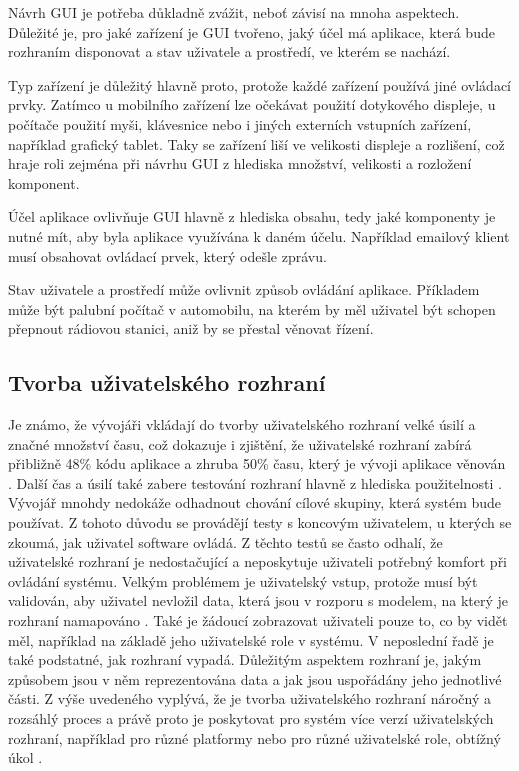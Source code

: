 Návrh GUI je potřeba důkladně zvážit, neboť závisí na mnoha aspektech. Důležité je, pro jaké zařízení je GUI tvořeno, jaký účel má aplikace, která bude rozhraním disponovat a stav uživatele a prostředí, ve kterém se nachází. 

Typ zařízení je důležitý hlavně proto, protože každé zařízení používá jiné ovládací prvky. Zatímco u mobilního zařízení lze očekávat použití dotykového displeje, u počítače použití myši, klávesnice nebo i jiných externích vstupních zařízení, například grafický tablet. Taky se zařízení liší ve velikosti displeje a rozlišení, což hraje roli zejména při návrhu GUI z hlediska množství, velikosti a rozložení komponent.

Účel aplikace ovlivňuje GUI hlavně z hlediska obsahu, tedy jaké komponenty je nutné mít, aby byla aplikace využívána k daném účelu. Například emailový klient musí obsahovat ovládací prvek, který odešle zprávu. 

Stav uživatele a prostředí může ovlivnit způsob ovládání aplikace. Příkladem může být palubní počítač v automobilu, na kterém by měl uživatel být schopen přepnout rádiovou stanici, aniž by se přestal věnovat řízení. 


\subsection{Tvorba uživatelského rozhraní}

Je známo, že vývojáři vkládají do tvorby uživatelského rozhraní velké úsilí a značné množství času, což dokazuje i zjištění, že uživatelské rozhraní zabírá přibližně 48\% kódu aplikace a zhruba 50\% času, který je vývoji aplikace věnován \cite{towards-smart-design}. Další čas a úsilí také zabere testování rozhraní hlavně z hlediska použitelnosti \cite{usability}. Vývojář mnohdy nedokáže odhadnout chování cílové skupiny, která systém bude používat. Z tohoto důvodu se provádějí testy s koncovým uživatelem, u kterých se zkoumá, jak uživatel software ovládá. Z těchto testů se často odhalí, že uživatelské rozhraní je nedostačující a neposkytuje uživateli potřebný komfort při ovládání systému. Velkým problémem je uživatelský vstup, protože musí být validován, aby uživatel nevložil data, která jsou v rozporu s modelem, na který je rozhraní namapováno \cite{cernyTEA}. Také je žádoucí zobrazovat uživateli pouze to, co by vidět měl, například na základě jeho uživatelské role v systému. V neposlední řadě je také podstatné, jak rozhraní vypadá. Důležitým aspektem rozhraní je, jakým způsobem jsou v něm reprezentována data a jak jsou uspořádány jeho jednotlivé části. Z výše uvedeného vyplývá, že je tvorba uživatelského rozhraní náročný a rozsáhlý proces a právě proto je poskytovat pro systém více verzí uživatelských rozhraní, například pro různé platformy nebo pro různé uživatelské role, obtížný úkol \cite{cernyTEA}.


